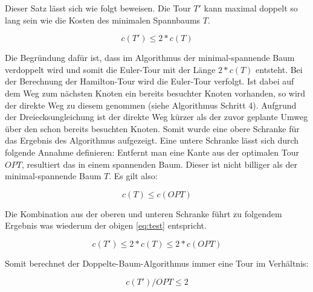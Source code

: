 \documentclass{article}
\begin{document}
Dieser Satz lässt sich wie folgt beweisen. Die Tour $T'$ kann maximal doppelt so lang sein wie die Kosten des minimalen Spannbaums $T$.

\begin{equation}
c(T') \leq 2 * c(T)
\end{equation}

Die Begründung dafür ist, dass im Algorithmus der minimal-spannende Baum verdoppelt wird und somit die Euler-Tour mit der Länge $2 * c(T)$ entsteht. Bei der Berechnung der Hamilton-Tour wird die Euler-Tour verfolgt. Ist dabei auf dem Weg zum nächsten Knoten ein bereits besuchter Knoten vorhanden, so wird der direkte Weg zu diesem genommen (siehe Algorithmus Schritt 4). Aufgrund der Dreiecksungleichung ist der direkte Weg kürzer als der zuvor geplante Umweg über den schon bereits besuchten Knoten. Somit wurde eine obere Schranke für das Ergebnis des Algorithmus aufgezeigt. Eine untere Schranke lässt sich durch folgende Annahme definieren: Entfernt man eine Kante aus der optimalen Tour $OPT$, resultiert das in einem spannenden Baum. Dieser ist nicht billiger als der minimal-spannende Baum $T$. Es gilt also:

\begin{equation}
c(T) \leq c(OPT)
\end{equation}

Die Kombination aus der oberen und unteren Schranke führt zu folgendem Ergebnis was wiederum der obigen \autoref{eq:test} entspricht.

\begin{equation}
c(T') \leq 2 * c(T) \leq 2 * c(OPT)
\end{equation}

Somit berechnet der Doppelte-Baum-Algorithmus immer eine Tour im Verhältnis:

\begin{equation}
c(T')/OPT \leq 2
\end{equation}


%
%
%
\nocite{busing2010graphen}
\nocite{jungnickel1994graphen}
\printbibliography[heading=bibnumbered,title={Literatur}]
\end{document}
